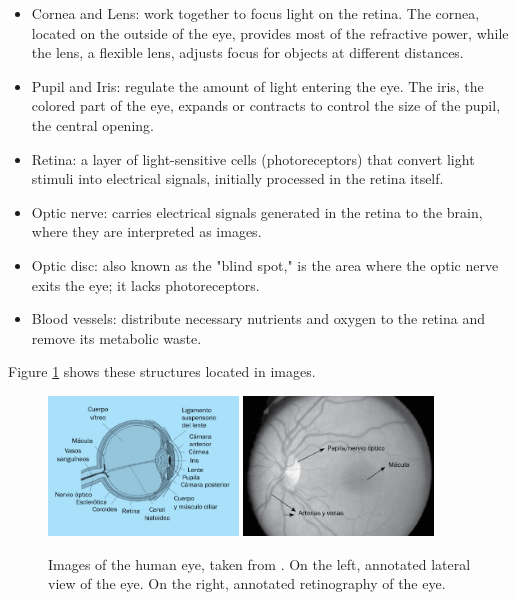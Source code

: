 \begin{itemize}
\item Cornea and Lens: work together to focus light on the retina. The cornea, located on the outside of the eye, provides most of the refractive power, while the lens, a flexible lens, adjusts focus for objects at different distances.
\item Pupil and Iris: regulate the amount of light entering the eye. The iris, the colored part of the eye, expands or contracts to control the size of the pupil, the central opening.
\item Retina: a layer of light-sensitive cells (photoreceptors) that convert light stimuli into electrical signals, initially processed in the retina itself.
\item Optic nerve: carries electrical signals generated in the retina to the brain, where they are interpreted as images.
\item Optic disc: also known as the "blind spot," is the area where the optic nerve exits the eye; it lacks photoreceptors.
\item Blood vessels: distribute necessary nutrients and oxygen to the retina and remove its metabolic waste.
\end{itemize}

Figure \ref{fig:imaxes_ojo} shows these structures located in images.

\begin{figure}[tbp]
    \centering
    \includegraphics[width=0.45\textwidth]{imaxes/ojo1.png}
    \includegraphics[width=0.45\textwidth]{imaxes/ojo2.png}
    \caption{Images of the human eye, taken from \cite{visionyojo}. On the left, annotated lateral view of the eye. On the right, annotated retinography of the eye.}
    \label{fig:imaxes_ojo}
\end{figure}

